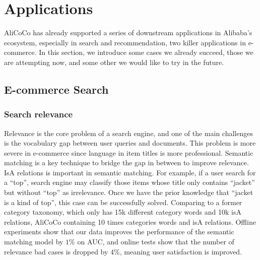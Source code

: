  \section{Applications}
\label{sec:application}
AliCoCo has already supported a series of downstream applications in Alibaba's ecosystem, especially in search and recommendation, two killer applications in e-commerce.
In this section, we introduce some cases we already succeed, those we are attempting now, and some other we would like to try in the future.

\subsection{E-commerce Search}

\subsubsection{Search relevance}

Relevance is the core problem of a search engine, and one of the main challenges is the vocabulary gap between user queries and documents. 
This problem is more severe in e-commerce since language in item titles is more professional. 
Semantic matching is a key technique to bridge the gap in between to improve relevance.
IsA relations is important in semantic matching. 
For example, if a user search for a ``top'', search engine may classify those items whose title only contains ``jacket'' but without ``top'' as irrelevance.
Once we have the prior knowledge that ``jacket is a kind of top'', 
this case can be successfully solved.
Comparing to a former category taxonomy, which only has 15k different category words and 10k isA relations,
AliCoCo containing 10 times categories words and isA relations.
Offline experiments show that our data improves the performance of the semantic matching model by $1\%$ on AUC, 
and online tests show that the number of relevance bad cases is dropped by $4\%$, meaning user satisfaction is improved.

